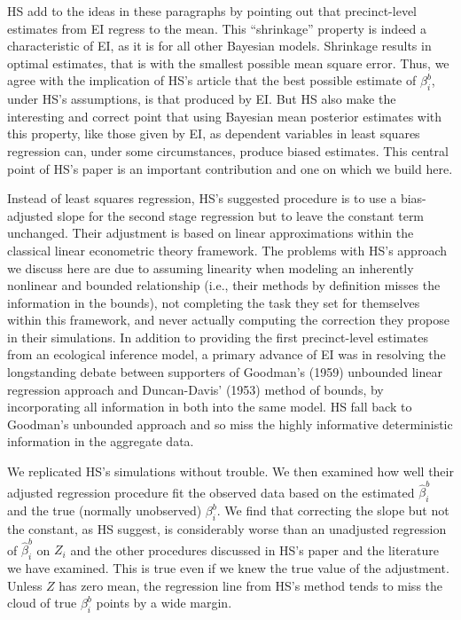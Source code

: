 \documentclass[11pt,titlepage]{article}
\begin{document}
HS add to the ideas in these paragraphs by pointing out that
precinct-level estimates from EI regress to the mean.  This
``shrinkage'' property is indeed a characteristic of EI, as it is for
all other Bayesian models.  Shrinkage results in optimal estimates,
that is with the smallest possible mean square error.  Thus, we agree
with the implication of HS's article that the best possible estimate
of $\beta^b_i$, under HS's assumptions, is that produced by EI.  But
HS also make the interesting and correct point that using Bayesian
mean posterior estimates with this property, like those given by EI,
as dependent variables in least squares regression can, under some
circumstances, produce biased estimates.  This central point of HS's
paper is an important contribution and one on which we build here.

Instead of least squares regression, HS's suggested procedure is to
use a bias-adjusted slope for the second stage regression but to leave
the constant term unchanged.  Their adjustment is based on linear
approximations within the classical linear econometric theory
framework.  The problems with HS's approach we discuss here are due to
assuming linearity when modeling an inherently nonlinear and bounded
relationship (i.e., their methods by definition misses the information
in the bounds), not completing the task they set for themselves within
this framework, and never actually computing the correction they
propose in their simulations.  In addition to providing the first
precinct-level estimates from an ecological inference model, a primary
advance of EI was in resolving the longstanding debate between
supporters of Goodman's (1959) unbounded linear regression approach
and Duncan-Davis' (1953) method of bounds, by incorporating all
information in both into the same model.  HS fall back to Goodman's
unbounded approach and so miss the highly informative deterministic
information in the aggregate data.

We replicated HS's simulations without trouble.  We then examined how
well their adjusted regression procedure fit the observed data based
on the estimated $\hat\beta_i^b$ and the true (normally unobserved)
$\beta_i^b$.  We find that correcting the slope but not the constant,
as HS suggest, is considerably worse than an unadjusted regression of
$\hat\beta_i^b$ on $Z_i$ and the other procedures discussed in HS's
paper and the literature we have examined.  This is true even if we
knew the true value of the adjustment.  Unless $Z$ has zero mean, the
regression line from HS's method tends to miss the cloud of true
$\beta_i^b$ points by a wide margin.
\end{document}
